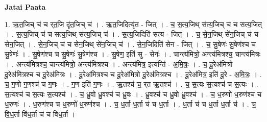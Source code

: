 \documentclass[17pt]{extarticle}
\begin{document}
\textbf{Jatai Paata} \newline

1. ऋ॒त॒जिच् च॑ च र्‌त॒जि दृ॑त॒जिच् च॑ । . ऋ॒त॒जिदित्यृ॑त - जित् । . च॒ स॒त्य॒जिथ् स॑त्य॒जिच् च॑ च सत्य॒जित् । . स॒त्य॒जिच् च॑ च सत्य॒जिथ् स॑त्य॒जिच् च॑ । . स॒त्य॒जिदिति॑ सत्य - जित् । . च॒ से॒न॒जिथ् से॑न॒जिच् च॑ च सेन॒जित् । . से॒न॒जिच् च॑ च सेन॒जिथ् से॑न॒जिच् च॑ । . से॒न॒जिदिति॑ सेन - जित् । . च॒ सु॒षेणः॑ सु॒षेण॑श्च च सु॒षेणः॑ । . सु॒षेण॑श्च च सु॒षेणः॑ सु॒षेण॑श्च । . सु॒षेण॒ इति॑ सु - सेनः॑ । . चान्त्य॑मित्रो॒ अन्त्य॑मित्रश्च॒ चान्त्य॑मित्रः । . अन्त्य॑मित्रश्च॒ चान्त्य॑मित्रो॒ अन्त्य॑मित्रश्च । . अन्त्य॑मित्र॒ इत्यन्ति॑ - अ॒मि॒त्रः॒ । . च॒ दू॒रेअ॑मित्रो दू॒रेअ॑मित्रश्च च दू॒रेअ॑मित्रः । . दू॒रेअ॑मित्रश्च च दू॒रेअ॑मित्रो दू॒रेअ॑मित्रश्च । . दू॒रेअ॑मित्र॒ इति॑ दू॒रे - अ॒मि॒त्रः॒ । . च॒ ग॒णो ग॒णश्च॑ च ग॒णः । . ग॒ण इति॑ ग॒णः । . ऋ॒तश्च॑ च॒ र्‌त ऋ॒तश्च॑ । . च॒ स॒त्यः स॒त्यश्च॑ च स॒त्यः । . स॒त्यश्च॑ च स॒त्यः स॒त्यश्च॑ । . च॒ ध्रु॒वो ध्रु॒वश्च॑ च ध्रु॒वः । . ध्रु॒वश्च॑ च ध्रु॒वो ध्रु॒वश्च॑ । . च॒ ध॒रुणो॑ ध॒रुण॑श्च च ध॒रुणः॑ । . ध॒रुण॑श्च च ध॒रुणो॑ ध॒रुण॑श्च । . च॒ ध॒र्ता ध॒र्ता च॑ च ध॒र्ता । . ध॒र्ता च॑ च ध॒र्ता ध॒र्ता च॑ । . च॒ वि॒ध॒र्ता वि॑ध॒र्ता च॑ च विध॒र्ता । \newline
\end{document}

